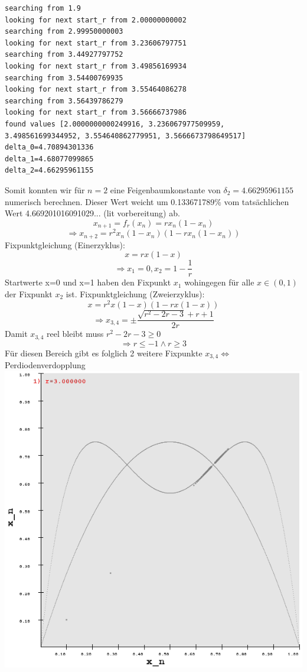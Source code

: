 \documentclass{scrartcl}
\begin{document}
\begin{lstlisting}
searching from 1.9
looking for next start_r from 2.00000000002
searching from 2.99950000003
looking for next start_r from 3.23606797751
searching from 3.44927797752
looking for next start_r from 3.49856169934
searching from 3.54400769935
looking for next start_r from 3.55464086278
searching from 3.56439786279
looking for next start_r from 3.56666737986
found values [2.0000000000249916, 3.236067977509959, 3.498561699344952, 3.554640862779951, 3.5666673798649517]
delta_0=4.70894301336
delta_1=4.68077099865
delta_2=4.66295961155
\end{lstlisting}
Somit konnten wir für $n=2$ eine Feigenbaumkonstante von $\delta_2=4.66295961155$ numerisch berechnen. Dieser Wert weicht um 0.133671789\% vom tatsächlichen Wert 4.669201016091029... (lit vorbereitung) ab. $$x_{n+1}=f_r(x_n)=rx_n(1-x_n)$$
$$\Rightarrow x_{n+2}=r^2x_n(1-x_n)(1-rx_n(1-x_n))$$
\newline
Fixpunktgleichung (Einerzyklus): 
$$x=rx(1-x)$$
$$\Rightarrow x_1=0, x_2=1-\frac{1}{r}$$
Startwerte x=0 und x=1 haben den Fixpunkt $x_1$ wohingegen für alle $x\in (0,1)$ der Fixpunkt $x_2$ ist.
\newline
Fixpunktgleichung (Zweierzyklus):
$$x=r^2x(1-x)(1-rx(1-x))$$
$$\Rightarrow x_{3,4}=\pm\frac{\sqrt{r^2-2 r-3}+r+1}{2 r}$$
Damit $x_{3,4}$ reel bleibt muss $r^2-2 r-3 \geq 0$
$$\Rightarrow r \leq -1 \land r \geq 3$$
Für diesen Bereich gibt es folglich 2 weitere Fixpunkte $x_{3,4} \Leftrightarrow$ Perdiodenverdopplung 
\newline
\includegraphics[scale=0.3]{r3}
\end{document}
